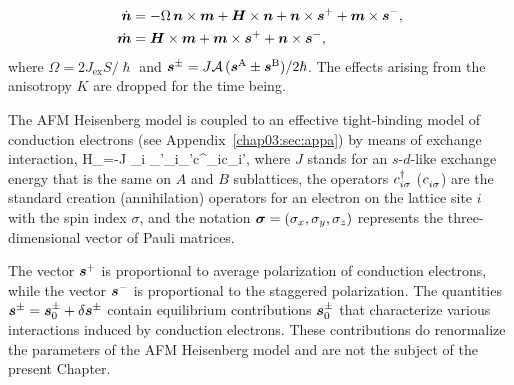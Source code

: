
\beml
\label{chap03:AFMEOM}
\begin{align}
\label{chap03:ndot}
\dot{\boldsymbol{n}} &= -\Omega\, \boldsymbol{n}\times\boldsymbol{m} +\boldsymbol{H}\times\boldsymbol{n}+\boldsymbol{n}\times\boldsymbol{s}^++\boldsymbol{m}\times\boldsymbol{s}^-,\\
\label{chap03:mdot}
\dot{\boldsymbol{m}} &= \boldsymbol{H}\times\boldsymbol{m}+\boldsymbol{m}\times\boldsymbol{s}^++\boldsymbol{n}\times\boldsymbol{s}^-,
\end{align}
\eml
where $\Omega=2J_\textrm{ex}S/\hslash$ and $\boldsymbol{s}^{\pm}= J \mathcal{A}\,(\boldsymbol{s}^\textrm{A}\pm\boldsymbol{s}^\textrm{B})/2\hslash$. The effects arising from the anisotropy $K$ are dropped for the time being. 

The AFM Heisenberg model is coupled to an effective tight-binding model of conduction electrons (see Appendix~\ref{chap03:sec:appa}) by means of exchange interaction,
\be
\label{chap03:ex}
H_=-J \s_{i} \s_{\sigma\sigma'}_i\cdot \bb{\sigma}_{\sigma\sigma'}c^\dagger_{i\sigma}c\0_{i\sigma'},
\e
where $J$ stands for an $s$-$d$-like exchange energy that is the same on $A$ and $B$ sublattices, the operators $c^\dagger_{i\sigma}$ ($c\0_{i\sigma}$) are the standard creation (annihilation) operators for an electron on the lattice site $i$ with the spin index $\sigma$, and the notation $\boldsymbol{\sigma}=(\sigma_x,\sigma_y,\sigma_z)$ represents the three-dimensional vector of Pauli matrices. 

The vector $\boldsymbol{s}^+$ is proportional to average polarization of conduction electrons, while the vector $\boldsymbol{s}^-$ is proportional to the staggered polarization. The quantities $\boldsymbol{s}^\pm=\boldsymbol{s}_0^\pm+\delta\boldsymbol{s}^\pm$ contain equilibrium contributions $\boldsymbol{s}_0^\pm$ that characterize various interactions induced by conduction electrons. These contributions do renormalize the parameters of the AFM Heisenberg model and are not the subject of the present Chapter. 

